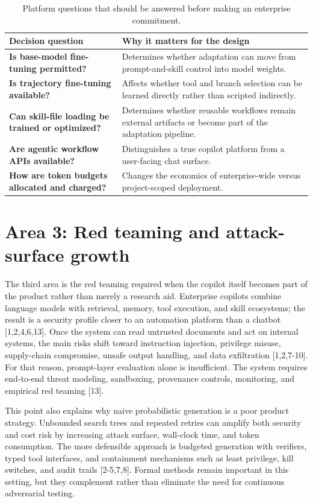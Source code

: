 \documentclass[11pt]{article}
\begin{document}
\begin{table}[H]
\centering
\begin{tabularx}{\textwidth}{>{\bfseries}p{}Y}
\toprule
Decision question & Why it matters for the design \\
\midrule
Is base-model fine-tuning permitted? & Determines whether adaptation can move from prompt-and-skill control into model weights. \\
Is trajectory fine-tuning available? & Affects whether tool and branch selection can be learned directly rather than scripted indirectly. \\
Can skill-file loading be trained or optimized? & Determines whether reusable workflows remain external artifacts or become part of the adaptation pipeline. \\
Are agentic workflow APIs available? & Distinguishes a true copilot platform from a user-facing chat surface. \\
How are token budgets allocated and charged? & Changes the economics of enterprise-wide versus project-scoped deployment. \\
\bottomrule
\end{tabularx}
\caption{Platform questions that should be answered before making an enterprise commitment.}
\label{tab:enterprise-questions}
\end{table}

\section{Area 3: Red teaming and attack-surface growth}

The third area is the red teaming required when the copilot itself becomes part of the product rather than merely a research aid. Enterprise copilots combine language models with retrieval, memory, tool execution, and skill ecosystems; the result is a security profile closer to an automation platform than a chatbot [1,2,4,6,13]. Once the system can read untrusted documents and act on internal systems, the main risks shift toward instruction injection, privilege misuse, supply-chain compromise, unsafe output handling, and data exfiltration [1,2,7-10]. For that reason, prompt-layer evaluation alone is insufficient. The system requires end-to-end threat modeling, sandboxing, provenance controls, monitoring, and empirical red teaming [13].

This point also explains why naive probabilistic generation is a poor product strategy. Unbounded search trees and repeated retries can amplify both security and cost risk by increasing attack surface, wall-clock time, and token consumption. The more defensible approach is budgeted generation with verifiers, typed tool interfaces, and containment mechanisms such as least privilege, kill switches, and audit trails [2-5,7,8]. Formal methods remain important in this setting, but they complement rather than eliminate the need for continuous adversarial testing.
\end{document}
